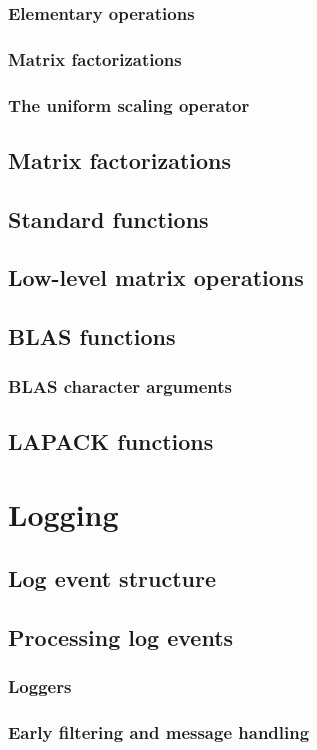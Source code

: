     \subsection{Elementary operations}
    \subsection{Matrix factorizations}
    \subsection{The uniform scaling operator}
    \section{Matrix factorizations}
    \section{Standard functions}
    \section{Low-level matrix operations}
    \section{BLAS functions}
    \subsection{BLAS character arguments}
    \section{LAPACK functions}
\chapter{Logging}
    \section{Log event structure}
    \section{Processing log events}
    \subsection{Loggers}
    \subsection{Early filtering and message handling}
